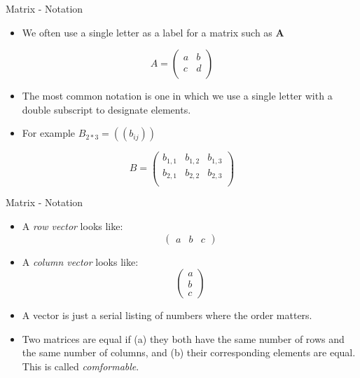 \documentclass[
  ignorenonframetext,
]{beamer}
\providecommand{\tightlist}{%
  \setlength{\itemsep}{0pt}\setlength{\parskip}{0pt}}
\begin{document}
\begin{frame}{Matrix - Notation}
\protect\hypertarget{matrix---notation-1}{}

\begin{itemize}
\tightlist
\item
  We often use a single letter as a label for a matrix such as
  \textbf{A}
\end{itemize}

\[ A= \begin{pmatrix}
  a & b  \\
  c & d  \\
 \end{pmatrix}\]

\begin{itemize}
\item
  The most common notation is one in which we use a single letter with a
  double subscript to designate elements.
\item
  For example \(B_{2*3}=((b_{ij}))\)
\end{itemize}

\[B =
 \begin{pmatrix}
  b_{1,1} & b_{1,2} & b_{1,3} \\
  b_{2,1} & b_{2,2} & b_{2,3} \\
 \end{pmatrix}\]

\end{frame}

\begin{frame}{Matrix - Notation}
\protect\hypertarget{matrix---notation-2}{}

\begin{itemize}
\item
  A \emph{row vector} looks like:
  \[\begin{pmatrix}a & b & c \end{pmatrix}\]
\item
  A \emph{column vector} looks like:
  \[\begin{pmatrix}a \\ b \\ c \end{pmatrix}\]
\item
  A vector is just a serial listing of numbers where the order matters.
\item
  Two matrices are equal if (a) they both have the same number of rows
  and the same number of columns, and (b) their corresponding elements
  are equal. This is called \emph{comformable}.
\end{itemize}

\end{frame}
\end{document}
